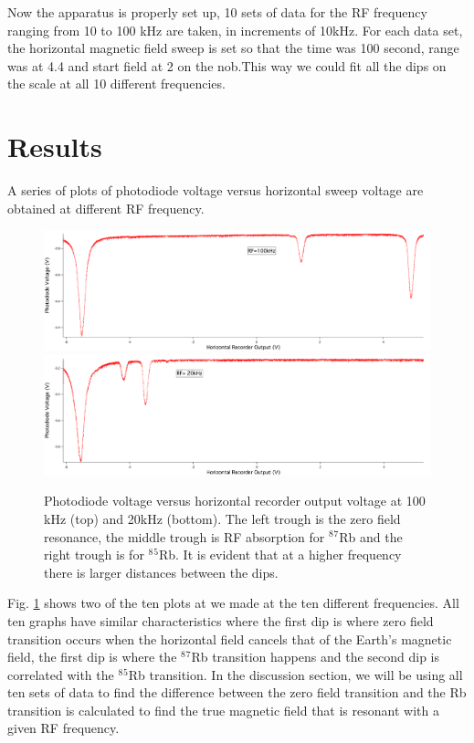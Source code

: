 \documentclass[prb,preprint]{revtex4-1}
\begin{document}
Now the apparatus is properly set up, 10 sets of data for the RF frequency ranging from 10 to 100 kHz are taken, in increments of 10kHz. For each data set, the horizontal magnetic field sweep is set so that the time was 100 second, range was at 4.4 and start field at 2 on the nob.This way we could fit all the dips on the scale at all 10 different frequencies.\\


\section{Results}

A series of plots of photodiode voltage versus horizontal sweep voltage are obtained at different RF frequency. \\

\begin{figure}[h!!!!!!!!]
\centering
\includegraphics[width=15cm]{100k.png}
\includegraphics[width=15cm]{20k.png}
\caption{Photodiode voltage versus horizontal recorder output voltage at 100 kHz (top) and 20kHz (bottom). The left trough is the zero field resonance, the middle trough is RF absorption for $^8$$^7$Rb and the right trough is for $^8$$^5$Rb. It is evident that at a higher frequency there is larger  distances between the dips.}
\label{100kHz}
\end{figure}


Fig. \ref{100kHz} shows two of the ten plots at we made at the ten different frequencies. All ten graphs have similar characteristics where the first dip is where zero field transition occurs when the horizontal field cancels that of the Earth's magnetic field, the first dip is where the  $^8$$^7$Rb transition happens and the second dip is correlated with the $^8$$^5$Rb transition. In the discussion section, we will be using all ten sets of data to find the difference between the zero field transition and the Rb transition is calculated to find the true magnetic field that is resonant with a given RF frequency.\\
\end{document}
